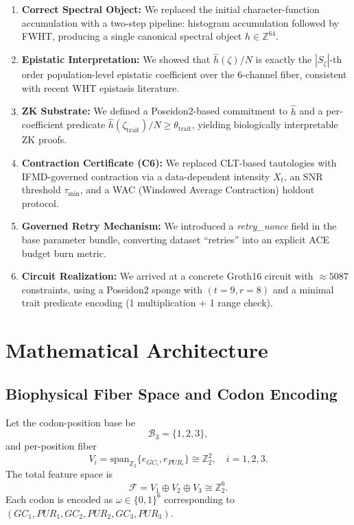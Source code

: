 \documentclass[11pt]{article}
\begin{document}
\begin{enumerate}[label=(\alph*),noitemsep]
  \item \textbf{Correct Spectral Object:} We replaced the initial
  character-function accumulation with a two-step pipeline:
  histogram accumulation followed by FWHT, producing a single
  canonical spectral object $\hat{h} \in \mathbb{Z}^{64}$.

  \item \textbf{Epistatic Interpretation:} We showed that
  $\hat{h}(\zeta)/N$ is exactly the $|S_\zeta|$-th order
  population-level epistatic coefficient over the 6-channel fiber,
  consistent with recent WHT epistasis literature.

  \item \textbf{ZK Substrate:} We defined a Poseidon2-based commitment
  to $\hat{h}$ and a per-coefficient predicate
  $\hat{h}(\zeta_{\text{trait}})/N \ge \theta_{\text{trait}}$,
  yielding biologically interpretable ZK proofs.

  \item \textbf{Contraction Certificate (C6):} We replaced CLT-based
  tautologies with IFMD-governed contraction via a data-dependent
  intensity $X_t$, an SNR threshold $\tau_{\min}$, and a WAC
  (Windowed Average Contraction) holdout protocol.

  \item \textbf{Governed Retry Mechanism:} We introduced a
  \emph{retry\_nonce} field in the base parameter bundle, converting
  dataset ``retries'' into an explicit ACE budget burn metric.

  \item \textbf{Circuit Realization:} We arrived at a concrete Groth16
  circuit with $\approx 5087$ constraints, using a
  Poseidon2 sponge with $(t=9,r=8)$ and a minimal trait predicate
  encoding (1 multiplication + 1 range check).
\end{enumerate}

\section{Mathematical Architecture}

\subsection{Biophysical Fiber Space and Codon Encoding}

Let the codon-position base be
\[
  \mathcal{B}_3 = \{1,2,3\},
\]
and per-position fiber
\[
  V_i = \text{span}_{\mathbb{Z}_2}\{ e_{GC_i}, e_{PUR_i} \} \cong \mathbb{Z}_2^{2}, \quad i=1,2,3.
\]
The total feature space is
\[
  \mathcal{F} = V_1 \oplus V_2 \oplus V_3 \cong \mathbb{Z}_2^{6}.
\]
Each codon is encoded as $\omega \in \{0,1\}^{6}$ corresponding to
$(GC_1,PUR_1,GC_2,PUR_2,GC_3,PUR_3)$.
\end{document}
